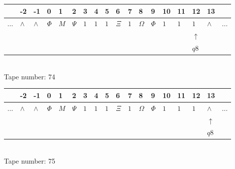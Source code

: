 \documentclass[11pt]{article}
\begin{document}
\begin{table}[H]
\centering
\begin{tabular}{llllllllllllllllll}
 & -2 & -1 & 0 & 1 & 2 & 3 & 4 & 5 & 6 & 7 & 8 & 9 & 10 & 11 & 12 & 13 & \\
\hline
$...$ & \multicolumn{1}{|l|}{$\wedge$} & \multicolumn{1}{|l|}{$\wedge$} & \multicolumn{1}{|l|}{$\Phi$} & \multicolumn{1}{|l|}{$M$} & \multicolumn{1}{|l|}{$\Psi$} & \multicolumn{1}{|l|}{$1$} & \multicolumn{1}{|l|}{$1$} & \multicolumn{1}{|l|}{$1$} & \multicolumn{1}{|l|}{$\Xi$} & \multicolumn{1}{|l|}{$1$} & \multicolumn{1}{|l|}{$\Omega$} & \multicolumn{1}{|l|}{$\Phi$} & \multicolumn{1}{|l|}{$1$} & \multicolumn{1}{|l|}{$1$} & \multicolumn{1}{|l|}{$1$} & \multicolumn{1}{|l|}{$\wedge$} & $...$\\
\hline
&  &  &  &  &  &  &  &  &  &  &  &  &  &  & $\uparrow$ &  &  \\
&  &  &  &  &  &  &  &  &  &  &  &  &  &  & $ q8 $ &  &  \\
\end{tabular}
\\
Tape number: 74
\noindent\makebox[\linewidth]{\hdashrule{\textwidth}{1pt}{1pt}}\end{table}

\begin{table}[H]
\centering
\begin{tabular}{llllllllllllllllll}
 & -2 & -1 & 0 & 1 & 2 & 3 & 4 & 5 & 6 & 7 & 8 & 9 & 10 & 11 & 12 & 13 & \\
\hline
$...$ & \multicolumn{1}{|l|}{$\wedge$} & \multicolumn{1}{|l|}{$\wedge$} & \multicolumn{1}{|l|}{$\Phi$} & \multicolumn{1}{|l|}{$M$} & \multicolumn{1}{|l|}{$\Psi$} & \multicolumn{1}{|l|}{$1$} & \multicolumn{1}{|l|}{$1$} & \multicolumn{1}{|l|}{$1$} & \multicolumn{1}{|l|}{$\Xi$} & \multicolumn{1}{|l|}{$1$} & \multicolumn{1}{|l|}{$\Omega$} & \multicolumn{1}{|l|}{$\Phi$} & \multicolumn{1}{|l|}{$1$} & \multicolumn{1}{|l|}{$1$} & \multicolumn{1}{|l|}{$1$} & \multicolumn{1}{|l|}{$\wedge$} & $...$\\
\hline
&  &  &  &  &  &  &  &  &  &  &  &  &  &  &  & $\uparrow$ &  \\
&  &  &  &  &  &  &  &  &  &  &  &  &  &  &  & $ q8 $ &  \\
\end{tabular}
\\
Tape number: 75
\noindent\makebox[\linewidth]{\hdashrule{\textwidth}{1pt}{1pt}}\end{table}
\end{document}
